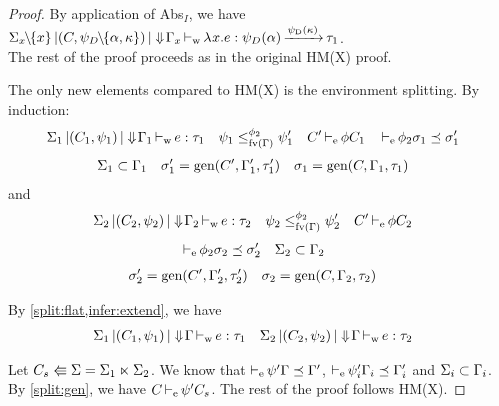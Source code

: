 \begin{proof}
  By application of {\sc Abs$_I$}, we have
  $\inferW{\Sv_x\Sdel{x}}{(C,\unif_D\Sdel{\tvar,\kvar})}{\Eflat\E_x}
  {\lam{x}{e}}{\unif_D(\tvar)\tarr{\unif_D(\kvar)}\tau_1}$.\\
  The rest of the proof proceeds as in the original HM(X) proof.
  \\



  The only new elements compared to HM(X) is
  the environment splitting.
  By induction:
  \begin{align*}
    \Sigma_1 \operatorname{|} (C_1,\mathrm{\psi}_1) \operatorname{|} \Downarrow\!\Gamma_1& \operatorname{\vdash_w} e : \tau_1
    &\mathrm{\psi}_1 &\leq^{\phi_2}_{\operatorname{fv}(\Gamma)} \mathrm{\psi}'_1
    &C'& \operatorname{\vdash_e} \phi C_1
    && \operatorname{\vdash_e} \phi_2 \sigma_1 \preceq \sigma'_1
  \end{align*}
  \begin{align*}
    \Sigma_1&\subset\Gamma_1
    &\sigma'_1 &= \operatorname{\text{gen}}(C',\Gamma'_1,\tau'_1)
    &\sigma_1 &= \operatorname{\text{gen}}(C,\Gamma_1,\tau_1)
  \end{align*}
  and
  \begin{align*}
    \Sigma_2 \operatorname{|} (C_2,\mathrm{\psi}_2) \operatorname{|} \Downarrow\!\Gamma_2& \operatorname{\vdash_w} e : \tau_2
    &\mathrm{\psi}_2 &\leq^{\phi_2}_{\operatorname{fv}(\Gamma)} \mathrm{\psi}'_2
    &C'& \operatorname{\vdash_e} \phi C_2
  \end{align*}
  \begin{align*}
    & \operatorname{\vdash_e} \phi_2 \sigma_2 \preceq \sigma'_2
    &\Sigma_2&\subset\Gamma_2
  \end{align*}
  \begin{align*}
    \sigma'_2 &= \operatorname{\text{gen}}(C',\Gamma'_2,\tau'_2)
    &\sigma_2 &= \operatorname{\text{gen}}(C,\Gamma_2,\tau_2)
  \end{align*}


  By \cref{split:flat,infer:extend}, we have
  \begin{align*}
    \Sigma_1 \operatorname{|} (C_1,\mathrm{\psi}_1) \operatorname{|} \Downarrow\!\Gamma& \operatorname{\vdash_w} e : \tau_1
    &\Sigma_2 \operatorname{|} (C_2,\mathrm{\psi}_2) \operatorname{|} \Downarrow\!\Gamma& \operatorname{\vdash_w} e : \tau_2
  \end{align*}

  Let $C_s \Lleftarrow \Sigma = \Sigma_1 \ltimes \Sigma_2$.
  We know that $\operatorname{\vdash_e} \mathrm{\psi}'\Gamma \preceq \Gamma'$,
  $\operatorname{\vdash_e} \mathrm{\psi}'_i\Gamma_i \preceq \Gamma'_i$ and $\Sigma_i\subset\Gamma_i$.
  By \cref{split:gen},
  we have $C \operatorname{\vdash_e} \mathrm{\psi}' C_s$.
  The rest of the proof follows HM(X).

\end{proof}


